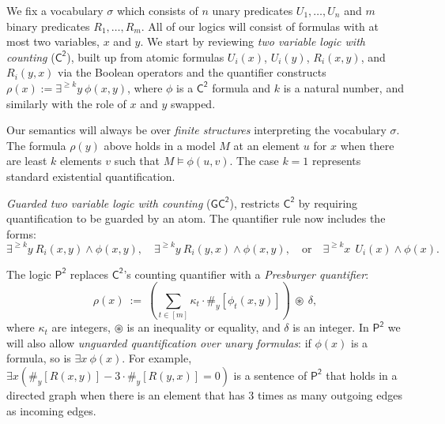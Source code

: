 \documentclass[10pt,a4paper]{article}
\theoremstyle{definition}
\theoremstyle{remark}
\newcommand{\vocab}{\sigma}
\newcommand{\Ctwo}    {\mathsf{C^2}}
\newcommand{\Ptwo}    {\mathsf{P^2}}
\newcommand{\GCtwo}   {\mathsf{GC^2}}
\newcommand{\presby}[1]  {{\#_y\left[ #1 \right]}}
\newcommand{\intsinterval}[1]{{\left[ #1 \right]}}
\begin{document}
We fix a vocabulary $\vocab$ which consists of $n$ unary predicates $U_1, \ldots, U_n$ and $m$ binary predicates $R_1, \ldots, R_m$. All of our logics will consist of formulas with at most two variables, $x$ and $y$.
We start by reviewing \emph{two variable logic with counting} ($\Ctwo$), built up from atomic formulas $U_i(x)$, $ U_i(y)$, $R_i(x, y)$, and $R_i(y, x)$
via the Boolean operators and the quantifier constructs
$\rho(x) := \exists^{\geq k} y\ \phi(x,y)$,
where $\phi$ is a $\Ctwo$ formula and $k$ is a natural number, and similarly with the role of $x$ and $y$ swapped.

Our semantics will always be over \emph{finite structures} interpreting the vocabulary $\vocab$.
The formula $\rho(y)$ above holds in a model $M$ at an element $u$ for $x$ when there are least $k$ elements $v$ such that $M \models \phi(u, v)$.
The case $k = 1$ represents standard existential quantification.

\emph{Guarded two variable logic with counting} ($\GCtwo$), restricts $\Ctwo$ by requiring quantification to be guarded by an atom. The quantifier rule now includes the forms:
\begin{equation*}
    \exists^{\geq k} y\ R_i(x, y) \land \phi(x,y),
    \quad
    \exists^{\geq k} y\ R_i(y,x) \land \phi(x,y),
    \quad \text{or} \quad
    \exists^{\geq k} x\ ~ U_i(x) \land \phi(x).
\end{equation*}


The logic $\Ptwo$ replaces $\Ctwo$'s counting quantifier with a \emph{Presburger quantifier}:
\begin{equation*}
    \rho(x)\ :=\ \left(
    \sum_{t \in \intsinterval{m}} \kappa_{t} \cdot \presby{ \phi_t(x,y)}  \right)
    \ \circledast\ \delta,
\end{equation*}
where $\kappa_t$ are integers,
$\circledast$ is an inequality or equality, and $\delta$ is an integer.
In $\Ptwo$ we will also allow \emph{unguarded quantification over unary formulas}: if $\phi(x)$ is a formula, so is
$\exists x\ \phi(x)$.
For example,
$\exists x \left(\presby{R(x,y)} - 3 \cdot \presby{R(y,x)} = 0\right)$
is a sentence of $\Ptwo$ that holds in a directed graph  when there is an element that has 3 times as many outgoing edges as incoming edges.
\end{document}
